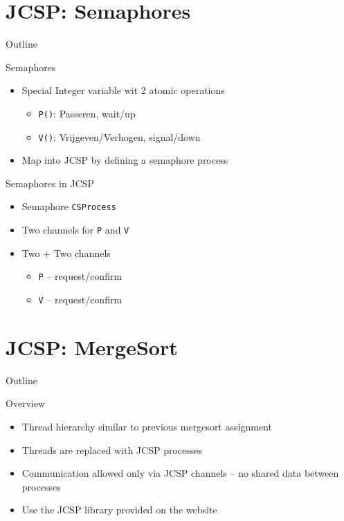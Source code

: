 \section{JCSP: Semaphores}

\begin{frame}{Outline}
  \tableofcontents[current]
\end{frame}

\begin{frame}[fragile]{Semaphores}
  \begin{itemize}
  \item Special Integer variable wit 2 atomic operations
    \begin{itemize}
    \item \lstinline!P()!: Passeren, wait/up
    \item \lstinline!V()!: Vrijgeven/Verhogen, signal/down
    \end{itemize}
  \item Map into JCSP by defining a semaphore process
  \end{itemize}
\end{frame}

\begin{frame}{Semaphores in JCSP}
  \begin{itemize}
  \item Semaphore \lstinline!CSProcess!
  \item Two channels for \lstinline!P! and \lstinline!V!
  \item Two + Two channels
    \begin{itemize}
    \item \lstinline!P! -- request/confirm
    \item \lstinline!V! -- request/confirm
    \end{itemize}
  \end{itemize}
\end{frame}


\section{JCSP: MergeSort}

\begin{frame}{Outline}
  \tableofcontents[current]
\end{frame}

\begin{frame}{Overview}
  \begin{itemize}
  \item Thread hierarchy similar to previous mergesort assignment
  \item Threads are replaced with JCSP processes
  \item Communication allowed only via JCSP channels – no shared data
    between processes
  \item Use the JCSP library provided on the website
  \end{itemize}
\end{frame}


